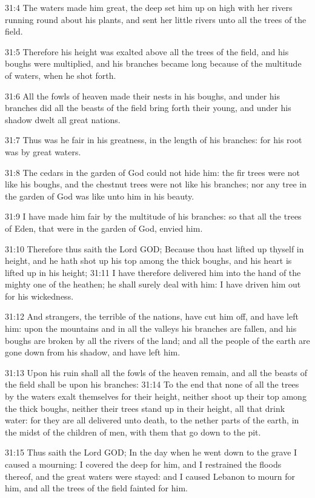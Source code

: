 31:4 The waters made him great, the deep set him up on high with her rivers running round about his plants, and sent her little rivers unto all the trees of the field.

31:5 Therefore his height was exalted above all the trees of the field, and his boughs were multiplied, and his branches became long because of the multitude of waters, when he shot forth.

31:6 All the fowls of heaven made their nests in his boughs, and under his branches did all the beasts of the field bring forth their young, and under his shadow dwelt all great nations.

31:7 Thus was he fair in his greatness, in the length of his branches: for his root was by great waters.

31:8 The cedars in the garden of God could not hide him: the fir trees were not like his boughs, and the chestnut trees were not like his branches; nor any tree in the garden of God was like unto him in his beauty.

31:9 I have made him fair by the multitude of his branches: so that all the trees of Eden, that were in the garden of God, envied him.

31:10 Therefore thus saith the Lord GOD; Because thou hast lifted up thyself in height, and he hath shot up his top among the thick boughs, and his heart is lifted up in his height; 31:11 I have therefore delivered him into the hand of the mighty one of the heathen; he shall surely deal with him: I have driven him out for his wickedness.

31:12 And strangers, the terrible of the nations, have cut him off, and have left him: upon the mountains and in all the valleys his branches are fallen, and his boughs are broken by all the rivers of the land; and all the people of the earth are gone down from his shadow, and have left him.

31:13 Upon his ruin shall all the fowls of the heaven remain, and all the beasts of the field shall be upon his branches: 31:14 To the end that none of all the trees by the waters exalt themselves for their height, neither shoot up their top among the thick boughs, neither their trees stand up in their height, all that drink water: for they are all delivered unto death, to the nether parts of the earth, in the midst of the children of men, with them that go down to the pit.

31:15 Thus saith the Lord GOD; In the day when he went down to the grave I caused a mourning: I covered the deep for him, and I restrained the floods thereof, and the great waters were stayed: and I caused Lebanon to mourn for him, and all the trees of the field fainted for him.

